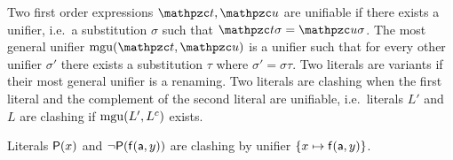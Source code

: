
\begin{definition}\label{def:unifier}
Two first order expressions $\mct, \mcu$ are {\myem unifiable} if there exists a {\myem unifier}, 
i.e.~a substitution $\sigma$ such that $\mct\sigma=\mcu\sigma$.
The {\myem most general unifier} $\mgu(\mct,\mcu)$ is a unifier such that
for every other unifier $\sigma'$ there exists a substitution $\tau$ where
$\sigma' = \sigma \tau$. 
Two literals are variants if their most general unifier is a renaming.
Two literals are {\myem clashing} when the first literal 
and the complement of the second literal are unifiable, 
i.e.~literals $L'$ and $L$ are clashing if $\operatorname{mgu}(L', L^c)$ exists.
\end{definition}

\begin{example}
	Literals ${\mathsf P}(x)$ and $\lnot{\mathsf P}({\mathsf f}({\mathsf a},y))$ 
	are clashing by unifier $\{ x\mapsto {\mathsf f}({\mathsf a},y)\}$.
\end{example}